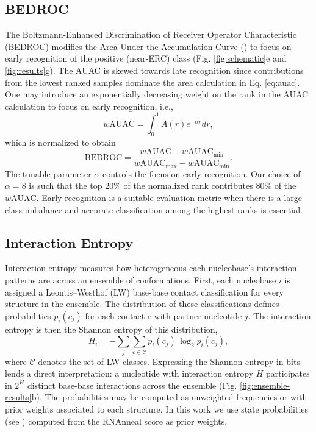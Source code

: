 \documentclass[%
aip,
 amsmath,amssymb,
reprint,%
twocolumn,
]{revtex4-1}
\makeatletter
\newcommand\setcurrentname[1]{\def\@currentlabelname{#1}}
\makeatother
\begin{document}
{\subsection*{BEDROC}
       \setcurrentname{BEDROC}
\label{methods:bedroc}


The Boltzmann-Enhanced Discrimination of Receiver Operator Characteristic (BEDROC) modifies the Area Under the Accumulation Curve () to focus on early recognition of the positive (near-ERC) class (Fig. \ref{fig:schematic}e and \ref{fig:results}g).\cite{truchon2007evaluating} The AUAC is skewed towards late recognition since contributions from the lowest ranked samples dominate the area calculation in Eq. \ref{eq:auac}. One may introduce an exponentially decreasing weight on the rank in the AUAC calculation to focus on early recognition, i.e.,
\begin{equation}
    \label{eq:wauac}
    w\mathrm{AUAC} = \int_0^1 A(r)e^{-\alpha r}dr,
\end{equation}
which is normalized to obtain
\begin{equation}
    \label{eq:bedroc}
    \mathrm{BEDROC} = \frac{w\mathrm{AUAC} - w\mathrm{AUAC}_{\mathrm{min}}}{w\mathrm{AUAC}_{\mathrm{max}} - w\mathrm{AUAC}_{\mathrm{min}}}.
\end{equation}
The tunable parameter $\alpha$ controls the focus on early recognition. Our choice of $\alpha=8$ is such that the top $20\%$ of the normalized rank contributes $80\%$ of the $w\mathrm{AUAC}$. Early recognition is a suitable evaluation metric when there is a large class imbalance and accurate classification among the highest ranks is essential.

\subsection*{Interaction Entropy}
       \setcurrentname{Interaction Entropy}
\label{methods:interaction-entropy}
Interaction entropy measures how heterogeneous each nucleobase’s interaction patterns are across an ensemble of conformations. First, each nucleobase $i$ is assigned a Leontis--Westhof (LW) base-base contact classification for every structure in the ensemble.\cite{leontis2001geometric} The distribution of these classifications defines probabilities $p_i(c_j)$ for each contact $c$ with partner nucleotide $j$. The interaction entropy is then the Shannon entropy of this distribution,
\[
H_i = -\sum_j \sum_{c \in \mathcal{C}} p_i(c_j) \,\log_2 p_i(c_j),
\]
where $\mathcal{C}$ denotes the set of LW classes. Expressing the Shannon entropy in bits lends a direct interpretation: a nucleotide with interaction entropy $H$ participates in $2^{H}$ distinct base-base interactions across the ensemble (Fig. \ref{fig:ensemble-results}b). The probabilities may be computed as unweighted frequencies or with prior weights associated to each structure. In this work we use state probabilities (see ) computed from the RNAnneal score as prior weights.

}
\end{document}
